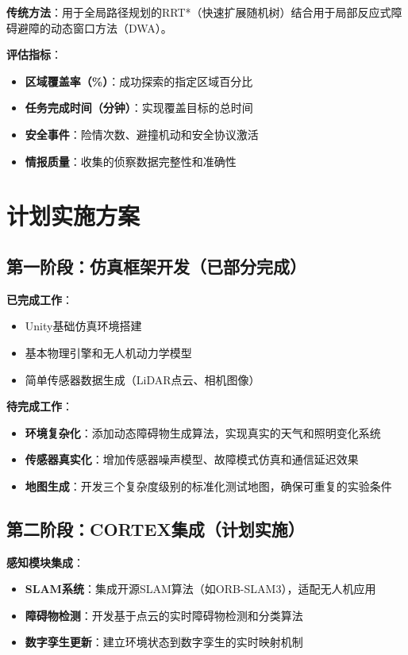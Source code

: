 \textbf{传统方法}：用于全局路径规划的RRT*（快速扩展随机树）结合用于局部反应式障碍避障的动态窗口方法（DWA）。

\textbf{评估指标}：
\begin{itemize}
\item \textbf{区域覆盖率（\%）}：成功探索的指定区域百分比
\item \textbf{任务完成时间（分钟）}：实现覆盖目标的总时间
\item \textbf{安全事件}：险情次数、避撞机动和安全协议激活
\item \textbf{情报质量}：收集的侦察数据完整性和准确性
\end{itemize}

\section{计划实施方案}

\subsection{第一阶段：仿真框架开发（已部分完成）}

\textbf{已完成工作}：
\begin{itemize}
\item Unity基础仿真环境搭建
\item 基本物理引擎和无人机动力学模型
\item 简单传感器数据生成（LiDAR点云、相机图像）
\end{itemize}

\textbf{待完成工作}：
\begin{itemize}
\item \textbf{环境复杂化}：添加动态障碍物生成算法，实现真实的天气和照明变化系统
\item \textbf{传感器真实化}：增加传感器噪声模型、故障模式仿真和通信延迟效果
\item \textbf{地图生成}：开发三个复杂度级别的标准化测试地图，确保可重复的实验条件
\end{itemize}

\subsection{第二阶段：CORTEX集成（计划实施）}

\textbf{感知模块集成}：
\begin{itemize}
\item \textbf{SLAM系统}：集成开源SLAM算法（如ORB-SLAM3），适配无人机应用
\item \textbf{障碍物检测}：开发基于点云的实时障碍物检测和分类算法
\item \textbf{数字孪生更新}：建立环境状态到数字孪生的实时映射机制
\end{itemize}

